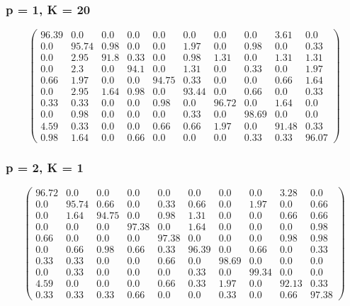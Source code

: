 \begin{appendices}
\subsubsection*{p = 1, K = 20}
$$\begin{pmatrix}
96.39&0.0&0.0&0.0&0.0&0.0&0.0&0.0&3.61&0.0\\
0.0&95.74&0.98&0.0&0.0&1.97&0.0&0.98&0.0&0.33\\
0.0&2.95&91.8&0.33&0.0&0.98&1.31&0.0&1.31&1.31\\
0.0&2.3&0.0&94.1&0.0&1.31&0.0&0.33&0.0&1.97\\
0.66&1.97&0.0&0.0&94.75&0.33&0.0&0.0&0.66&1.64\\
0.0&2.95&1.64&0.98&0.0&93.44&0.0&0.66&0.0&0.33\\
0.33&0.33&0.0&0.0&0.98&0.0&96.72&0.0&1.64&0.0\\
0.0&0.98&0.0&0.0&0.0&0.33&0.0&98.69&0.0&0.0\\
4.59&0.33&0.0&0.0&0.66&0.66&1.97&0.0&91.48&0.33\\
0.98&1.64&0.0&0.66&0.0&0.0&0.0&0.33&0.33&96.07
\end{pmatrix}$$

\subsubsection*{p = 2, K = 1}
$$\begin{pmatrix}
96.72&0.0&0.0&0.0&0.0&0.0&0.0&0.0&3.28&0.0\\
0.0&95.74&0.66&0.0&0.33&0.66&0.0&1.97&0.0&0.66\\
0.0&1.64&94.75&0.0&0.98&1.31&0.0&0.0&0.66&0.66\\
0.0&0.0&0.0&97.38&0.0&1.64&0.0&0.0&0.0&0.98\\
0.66&0.0&0.0&0.0&97.38&0.0&0.0&0.0&0.98&0.98\\
0.0&0.66&0.98&0.66&0.33&96.39&0.0&0.66&0.0&0.33\\
0.33&0.33&0.0&0.0&0.66&0.0&98.69&0.0&0.0&0.0\\
0.0&0.33&0.0&0.0&0.0&0.33&0.0&99.34&0.0&0.0\\
4.59&0.0&0.0&0.0&0.66&0.33&1.97&0.0&92.13&0.33\\
0.33&0.33&0.33&0.66&0.0&0.0&0.33&0.0&0.66&97.38
\end{pmatrix}$$


\end{appendices}
